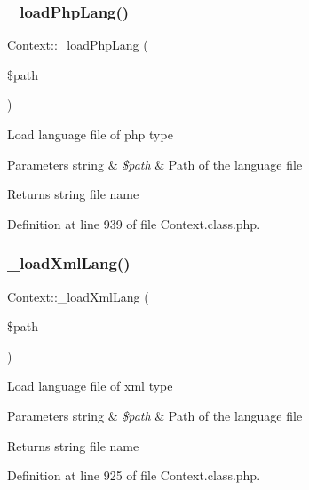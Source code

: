 \subsubsection{\texorpdfstring{\+\_\+load\+Php\+Lang()}{\_loadPhpLang()}}
{\footnotesize\ttfamily Context\+::\+\_\+load\+Php\+Lang (\begin{DoxyParamCaption}\item[{}]{\$path }\end{DoxyParamCaption})}

Load language file of php type


\begin{DoxyParams}[1]{Parameters}
string & {\em \$path} & Path of the language file \\
\hline
\end{DoxyParams}
\begin{DoxyReturn}{Returns}
string file name 
\end{DoxyReturn}


Definition at line 939 of file Context.\+class.\+php.

\mbox{\label{classContext_af3ba6aaa8fa5f6c758b7716ec7135ab3}} 
\subsubsection{\texorpdfstring{\+\_\+load\+Xml\+Lang()}{\_loadXmlLang()}}
{\footnotesize\ttfamily Context\+::\+\_\+load\+Xml\+Lang (\begin{DoxyParamCaption}\item[{}]{\$path }\end{DoxyParamCaption})}

Load language file of xml type


\begin{DoxyParams}[1]{Parameters}
string & {\em \$path} & Path of the language file \\
\hline
\end{DoxyParams}
\begin{DoxyReturn}{Returns}
string file name 
\end{DoxyReturn}


Definition at line 925 of file Context.\+class.\+php.

\mbox{\label{classContext_aae89f13e0d99577a6cb8a3bac584cee1}} 
